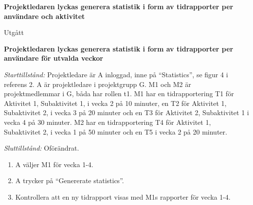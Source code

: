 \documentclass[a4paper]{article}
\begin{document}
\begin{FT}
\item
\textbf{Projektledaren lyckas generera statistik i form av tidrapporter per användare och aktivitet}

Utgått





\item
\textbf{Projektledaren lyckas generera statistik i form av tidrapporter per användare för utvalda veckor}

\emph{Starttillstånd:} Projektledare är A inloggad, inne på ``Statistics'', se figur 4 i referens 2. A är projektledare i projektgrupp G. M1 och M2 är projektmedlemmar i G, båda har rollen t1. M1 har en tidrapportering T1 för Aktivitet 1, Subaktivitet 1, i vecka 2 på 10 minuter, en T2 för Aktivitet 1, Subaktivitet 2, i vecka 3 på 20 minuter och en T3 för Aktivitet 2, Subaktivitet 1 i vecka 4 på 30 minuter. M2 har en tidrapportering T4 för Aktivitet 1, Subaktivitet 2, i vecka 1 på 50 minuter och en T5 i vecka 2 på 20 minuter.

\emph{Sluttillstånd:} Oförändrat.

\begin{enumerate}
\item A väljer M1 för vecka 1-4.
\item A trycker på ``Genererate statistics''.
\item Kontrollera att en ny tidrapport visas med M1s rapporter för vecka 1-4.
\end{enumerate}



\end{FT}
\end{document}
